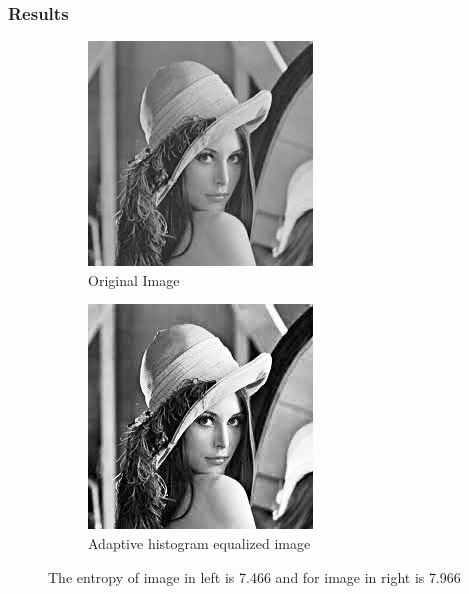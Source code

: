 \documentclass[12pt, a4paper, font = Times New Roman]{article}
\begin{document}
\subsubsection{Results}
\begin{figure}[!h]
  \begin{subfigure}[b]{0.5\textwidth}
    \includegraphics[width=\textwidth]{lena.jpg}
    \caption{Original Image}
    \label{fig:lena}
  \end{subfigure}
  \hfill
  \begin{subfigure}[b]{0.5\textwidth}
    \includegraphics[width=\textwidth]{result_lena.jpg}
    \caption{Adaptive histogram equalized image}
    \label{fig:result_lena}
  \end{subfigure}
  \caption{The entropy of image in left is 7.466 and for image in right is 7.966}
\end{figure}
\end{document}
